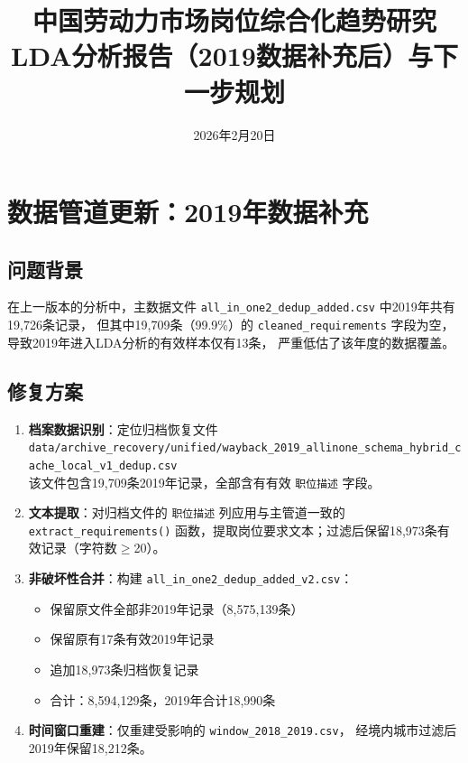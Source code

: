 \documentclass[12pt,a4paper]{ctexart}
\title{\textbf{中国劳动力市场岗位综合化趋势研究}\\
\large LDA分析报告（2019数据补充后）与下一步规划}
\author{}
\date{2026年2月20日}
\begin{document}
\maketitle
\tableofcontents
\newpage

\section{数据管道更新：2019年数据补充}

\subsection{问题背景}

在上一版本的分析中，主数据文件 \texttt{all\_in\_one2\_dedup\_added.csv} 中2019年共有19,726条记录，
但其中19,709条（99.9\%）的 \texttt{cleaned\_requirements} 字段为空，导致2019年进入LDA分析的有效样本仅有13条，
严重低估了该年度的数据覆盖。

\subsection{修复方案}

\begin{enumerate}
    \item \textbf{档案数据识别}：定位归档恢复文件\\
    \texttt{data/archive\_recovery/unified/wayback\_2019\_allinone\_schema\_hybrid\_cache\_local\_v1\_dedup.csv}\\
    该文件包含19,709条2019年记录，全部含有有效 \texttt{职位描述} 字段。

    \item \textbf{文本提取}：对归档文件的 \texttt{职位描述} 列应用与主管道一致的
    \texttt{extract\_requirements()} 函数，提取岗位要求文本；过滤后保留18,973条有效记录（字符数$\geq$20）。

    \item \textbf{非破坏性合并}：构建 \texttt{all\_in\_one2\_dedup\_added\_v2.csv}：
    \begin{itemize}
        \item 保留原文件全部非2019年记录（8,575,139条）
        \item 保留原有17条有效2019年记录
        \item 追加18,973条归档恢复记录
        \item 合计：8,594,129条，2019年合计18,990条
    \end{itemize}

    \item \textbf{时间窗口重建}：仅重建受影响的 \texttt{window\_2018\_2019.csv}，
    经境内城市过滤后2019年保留18,212条。
\end{enumerate}
\end{document}
